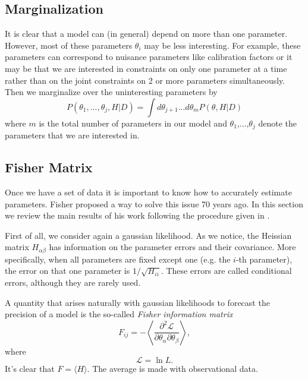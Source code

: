 \documentclass[onecolumn,           %
               showpacs,            %
               preprintnumbers,     %
               aps,                 %
               prl,          	    %
               letterpaper,             %
               superscriptaddress,      %
               nofootinbib,         %
               tightenlines,        %
               floats,floatfix      %
               ,usenatbib,
               ]{revtex4-1}
\begin{document}
\subsection{Marginalization}

It is clear that a model can (in general) depend on more than one parameter. However, most of these parameters $\theta_i$ may be less interesting. For example, these parameters can correspond to nuisance parameters like calibration factors or it may be that we are interested in constraints on only one parameter at a time rather than on the joint constraints on 2 or more parameters simultaneously. Then we marginalize over the uninteresting parameters by
\begin{equation}
P(\theta_1,...,\theta_j,H|D)=\int d\theta_{j+1}...d\theta_{m}P(\theta,H|D)
\end{equation}
where $m$ is the total number of parameters in our model and $\theta_1$,...,$\theta_j$ denote the parameters that we are interested in.

\subsection{Fisher Matrix}

Once we have a set of data it is important to know how to accurately estimate parameters. Fisher \cite{Fisher} proposed a way to solve this issue 70 years ago. In this section we review the main results of his work following the procedure given in \cite{LiV}.

First of all, we consider again a gaussian likelihood. As we notice, the Heissian matrix $H_{\alpha\beta}$ has information on the parameter errors and their covariance. More specifically, when all parameters are fixed except one (e.g. the $i$-th parameter), the error on that one parameter is $1/\sqrt{H_{ii}}$. These errors are called conditional errors, although they are rarely used.

A quantity that arises naturally with gaussian likelihoods to forecast the precision of a model is the so-called \textit{Fisher information matrix}
\begin{equation}
F_{ij}=-\left\langle \frac{\partial^2 \mathcal{L}}{\partial \theta_\alpha \partial \theta_\beta}\right\rangle,
\end{equation}
where 
\begin{equation}
\mathcal{L}=\ln L.
\end{equation}
It's clear that $F=\langle H\rangle$. The average is made with observational data. 
\end{document}
